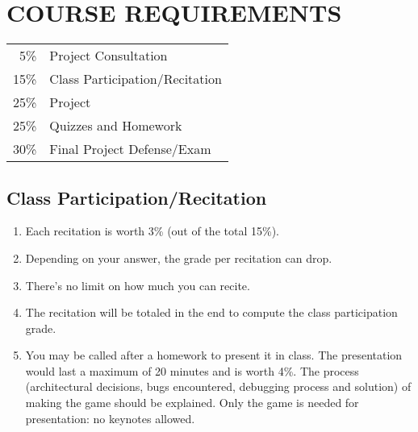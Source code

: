 \documentclass[10pt]{article}
\begin{document}
\section{COURSE REQUIREMENTS}
\begin{center}
\begin{tabular}{rl}
5\% & Project Consultation\\
15\% & Class Participation/Recitation\\
25\% & Project\\
25\% & Quizzes and Homework\\
30\% & Final Project Defense/Exam\\
\end{tabular}
\end{center}

\subsection{Class Participation/Recitation}
\begin{enumerate}[noitemsep]
\item Each recitation is worth 3\% (out of the total 15\%).
\item Depending on your answer, the grade per recitation can drop.
\item There's no limit on how much you can recite.
\item The recitation will be totaled in the end to compute the class participation grade.
\item You may be called after a homework to present it in class. The presentation would last a maximum of 20 minutes and is worth 4\%. The process (architectural decisions, bugs encountered, debugging process and solution) of making the game should be explained. Only the game is needed for presentation: no keynotes allowed.
\end{enumerate}
\end{document}
